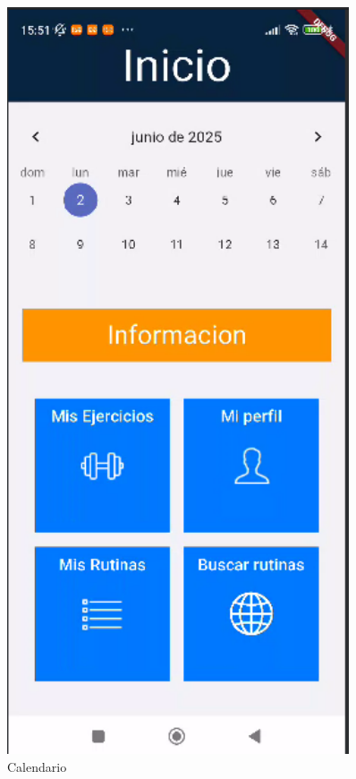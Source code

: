 \begin{figure}[H]
   \centering
   \begin{minipage}{0.4\textwidth}
      \centering
      \includegraphics[width=0.9\textwidth]{pantallas/Calendario.png}
      \caption{Calendario}
      \label{fig:Calendario}

\end{minipage}
\end{figure}
